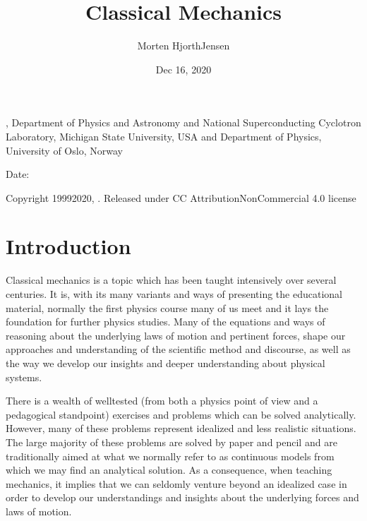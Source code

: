 \documentclass[letterpaper,10pt,english]{sphinxmanual}
\title{Classical Mechanics}
\date{Dec 16, 2020}
\author{Morten Hjorth\sphinxhyphen{}Jensen}
\begin{document}
\pagestyle{empty}
\sphinxmaketitle
\pagestyle{plain}
\sphinxtableofcontents
\pagestyle{normal}
\label{\detokenize{chapter1::doc}}








, Department of Physics and Astronomy and National Superconducting Cyclotron Laboratory, Michigan State University, USA and Department of Physics, University of Oslo, Norway









Date: 

Copyright 1999\sphinxhyphen{}2020, . Released under CC Attribution\sphinxhyphen{}NonCommercial 4.0 license


\chapter{Introduction}
\label{\detokenize{chapter1:introduction}}
Classical mechanics is a topic which has been taught intensively over
several centuries. It is, with its many variants and ways of
presenting the educational material, normally the first  physics
course many of us meet and it lays the foundation for further physics
studies. Many of the equations and ways of reasoning about the
underlying laws of motion and pertinent forces, shape our approaches and understanding
of the scientific method and discourse, as well as the way we develop our insights
and deeper understanding about physical systems.

There is a wealth of
well\sphinxhyphen{}tested (from both a physics point of view and a pedagogical
standpoint) exercises and problems which can be solved
analytically. However, many of these problems represent idealized and
less realistic situations.  The large majority of these problems are
solved by paper and pencil and are traditionally aimed
at what we normally refer to as continuous models from which we may find an analytical solution.  As a consequence,
when teaching mechanics, it implies that we can seldomly venture beyond an idealized case
in order to develop our understandings and insights about the
underlying forces and laws of motion.
\end{document}
